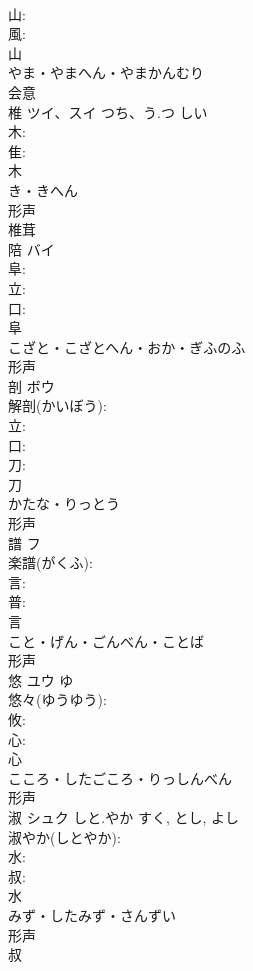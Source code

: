 \documentclass[8pt]{extreport}
\begin{document}
\begin{CJK}{UTF8}{min}
\\	山: 
\\	風: 
\\	山	
\\	やま・やまへん・やまかんむり	
\\	会意 
\\	椎	ツイ、スイ	つち、う.つ	しい	
\\	木: 
\\	隹: 
\\	木	
\\	き・きへん	
\\	形声 
\\	椎茸 
\\	陪	バイ			
\\	阜: 
\\	立: 
\\	口: 
\\	阜	
\\	こざと・こざとへん・おか・ぎふのふ	
\\	形声 
\\	剖	ボウ			
\\	解剖(かいぼう): 
\\	立: 
\\	口: 
\\	刀: 
\\	刀	
\\	かたな・りっとう	
\\	形声 
\\	譜	フ			
\\	楽譜(がくふ): 
\\	言: 
\\	普: 
\\	言	
\\	こと・げん・ごんべん・ことば	
\\	形声 
\\	悠	ユウ		ゆ	
\\	悠々(ゆうゆう): 
\\	攸: 
\\	心: 
\\	心	
\\	こころ・したごころ・りっしんべん	
\\	形声 
\\	淑	シュク	しと.やか	すく, とし, よし	
\\	淑やか(しとやか): 
\\	水: 
\\	叔: 
\\	水	
\\	みず・したみず・さんずい	
\\	形声 
\\	叔 

\end{CJK}
\end{document}
